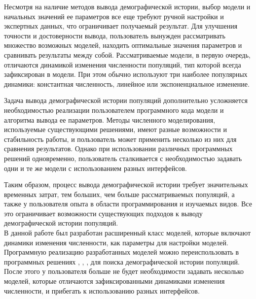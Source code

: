 \documentclass[a4paper,14pt,oneside,openany,article]{memoir}
\begin{document}
Несмотря на наличие методов вывода демографической истории, выбор модели и начальных значений ее параметров все еще требуют ручной настройки и экспертных данных, что ограничивает получаемый результат.
Для улучшения точности и достоверности вывода, пользователь вынужден рассматривать множество возможных моделей, находить оптимальные значения параметров и сравнивать результаты между собой.
Рассматриваемые модели, в первую очередь, отличаются динамикой изменения численности популяций, тип которой всегда зафиксирован в модели.
При этом обычно используют три наиболее популярных динамики: константная численность, линейное или экспоненциальное изменение.

Задача вывода демографической истории популяций дополнительно усложняется необходимостью реализации пользователем программного кода модели и алгоритма вывода ее параметров.
Методы численного моделирования, используемые существующими решениями, имеют разные возможности и стабильность работы, и пользователь может применить несколько из них для сравнения результатов.
Однако при использовании различных программных решений одновременно, пользователь сталкивается с необходимостью задавать одни и те же модели с использованием разных интерфейсов.

Таким образом, процесс вывода демографической истории требует значительных временных затрат, тем больших, чем больше рассматриваемых популяций, а также у пользователя опыта в области программирования и изучаемых видов.
Все это ограничивает возможности существующих подходов к выводу демографической истории популяций.\\

\newpage
В данной работе был разработан расширенный класс моделей, которые включают динамики изменения численности, как параметры для настройки моделей.
Программную реализацию разработанных моделей можно переиспользовать в программных решениях \dadi, \moments, \momentsLD, \momi для поиска демографической истории популяций.
После этого у пользователя больше не будет необходимости задавать несколько моделей, которые отличаются зафиксированными динамиками изменения численности, и прибегать к использованию разных интерфейсов.
\end{document}
